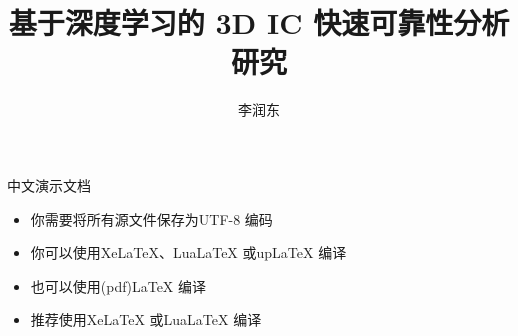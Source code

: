 \documentclass[UTF8]{ctexbeamer}
\title{基于深度学习的 3D IC 快速可靠性分析研究}
\author{李润东\inst{1}}
\institute[电子科技大学]{
    \inst{1}
    微电子与固体电子学院
}
\begin{document}
\begin{frame}
    \titlepage
\end{frame}

\begin{frame}{中文演示文档}
\begin{itemize}
    \item 你需要将所有源文件保存为UTF-8 编码
    \item 你可以使用XeLaTeX、LuaLaTeX 或upLaTeX 编译
    \item 也可以使用(pdf)LaTeX 编译
    \item 推荐使用XeLaTeX 或LuaLaTeX 编译
\end{itemize}
\end{frame}
\end{document}
